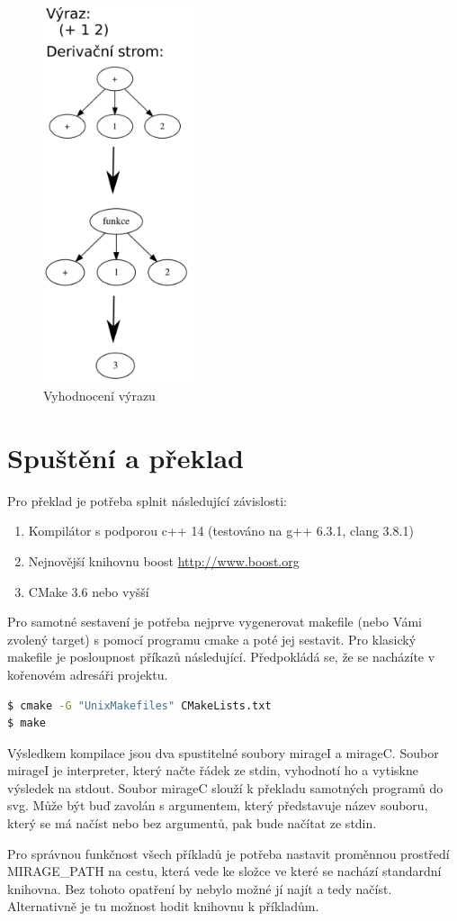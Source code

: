 \documentclass[a4paper,11pt]{article}
\begin{document}
\begin{figure}[!h]
	\FloatBarrier
    \centering
    \includegraphics[width=0.4\textwidth]{obrazky/preklad.png}
    \caption{Vyhodnocení výrazu}
    \label{fig:Popis překladu}
\end{figure}
\newpage{}
\section{Spuštění a překlad}
Pro překlad je potřeba splnit následující závislosti:
\begin{enumerate}
\item Kompilátor s podporou c++ 14 (testováno na g++ 6.3.1, clang 3.8.1)
\item Nejnovější knihovnu boost \url{http://www.boost.org}
\item CMake 3.6 nebo vyšší
\end{enumerate}
Pro samotné sestavení je potřeba nejprve vygenerovat makefile (nebo Vámi zvolený target) s pomocí programu cmake a poté jej sestavit. Pro klasický makefile je posloupnost příkazů následující. Předpokládá se, že se nacházíte v kořenovém adresáři projektu.
\begin{lstlisting}[language=bash]
$ cmake -G "UnixMakefiles" CMakeLists.txt
$ make
\end{lstlisting}
Výsledkem kompilace jsou dva spustitelné soubory mirageI a mirageC. Soubor mirageI je interpreter, který načte řádek ze stdin, vyhodnotí ho a vytiskne výsledek na stdout. Soubor mirageC slouží k překladu samotných programů do svg. Může být buď zavolán s argumentem, který představuje název souboru, který se má načíst nebo bez argumentů, pak bude načítat ze stdin.

Pro správnou funkčnost všech příkladů je potřeba nastavit proměnnou prostředí MIRAGE\_PATH na cestu, která vede ke složce ve které se nachází standardní knihovna. Bez tohoto opatření by nebylo možné jí najít a tedy načíst. Alternativně je tu možnost hodit knihovnu k příkladům.
\end{document}
